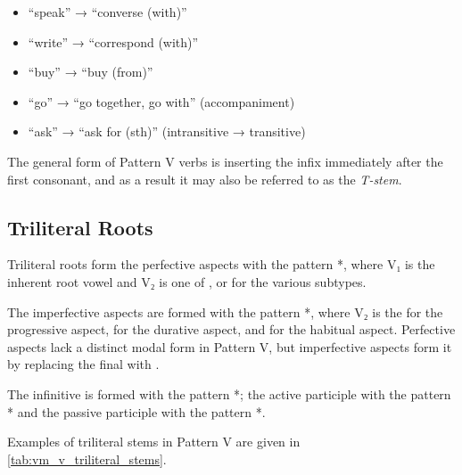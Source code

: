 \documentclass[grammar]{subfiles}
\begin{document}
\begin{itemize}
  \item {} “speak” →  “converse (with)”
  \item {} “write” →  “correspond (with)”
  \item {} “buy” →  “buy (from)”
  \item {} “go” →  “go together, go with” (accompaniment)
  \item {} “ask” →  “ask for (sth)” (intransitive → transitive)
\end{itemize}

The general form of Pattern V verbs is inserting the infix  immediately
after the first consonant, and as a result it may also be referred to as the \emph{T-stem}. 


\subsection{Triliteral Roots}
\label{ssec:vm_v_triliteral_roots}

Triliteral roots form the perfective aspects with the pattern
*, where V₁ is the inherent root vowel and V₂ is one of ,
 or  for the various subtypes.  

The imperfective aspects are formed with the pattern *, where
V₂ is the  for the progressive aspect,  for the durative aspect,
and  for the habitual aspect.  Perfective aspects lack a distinct modal
form in Pattern V, but imperfective aspects form it by replacing the final
 with . 

The infinitive is formed with the pattern *; the active
participle with the pattern * and the passive participle with the
pattern *. 

Examples of triliteral stems in Pattern V are given in
\cref{tab:vm_v_triliteral_stems}. 
\end{document}
